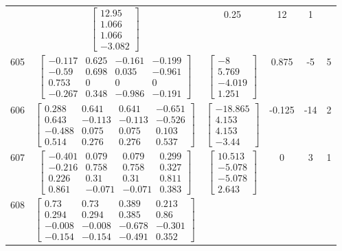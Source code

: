 \documentclass[a4paper,12pt]{article}
\begin{document}
\begin{tabular}{c c c c c c}
&
$\begin{bmatrix} 12.95 \\ 1.066 \\ 1.066 \\ -3.082 \end{bmatrix}$
&
0.25
&
12
&
1
\\
605
&
$\begin{bmatrix} -0.117 & 0.625 & -0.161 & -0.199 \\ -0.59 & 0.698 & 0.035 & -0.961 \\ 0.753 & 0 & 0 & 0 \\ -0.267 & 0.348 & -0.986 & -0.191 \end{bmatrix}$
&
$\begin{bmatrix} -8 \\ 5.769 \\ -4.019 \\ 1.251 \end{bmatrix}$
&
0.875
&
-5
&
5
\\
606
&
$\begin{bmatrix} 0.288 & 0.641 & 0.641 & -0.651 \\ 0.643 & -0.113 & -0.113 & -0.526 \\ -0.488 & 0.075 & 0.075 & 0.103 \\ 0.514 & 0.276 & 0.276 & 0.537 \end{bmatrix}$
&
$\begin{bmatrix} -18.865 \\ 4.153 \\ 4.153 \\ -3.44 \end{bmatrix}$
&
-0.125
&
-14
&
2
\\
607
&
$\begin{bmatrix} -0.401 & 0.079 & 0.079 & 0.299 \\ -0.216 & 0.758 & 0.758 & 0.327 \\ 0.226 & 0.31 & 0.31 & 0.811 \\ 0.861 & -0.071 & -0.071 & 0.383 \end{bmatrix}$
&
$\begin{bmatrix} 10.513 \\ -5.078 \\ -5.078 \\ 2.643 \end{bmatrix}$
&
0
&
3
&
1
\\
608
&
$\begin{bmatrix} 0.73 & 0.73 & 0.389 & 0.213 \\ 0.294 & 0.294 & 0.385 & 0.86 \\ -0.008 & -0.008 & -0.678 & -0.301 \\ -0.154 & -0.154 & -0.491 & 0.352 \end{bmatrix}$

\end{tabular}
\end{document}
